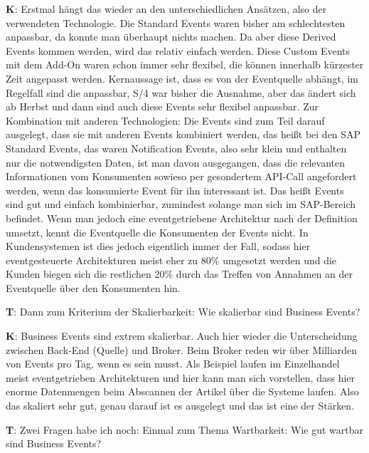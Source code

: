 \begin{list}{X:}{\setlength{\labelsep}{5mm}}
    \item[\textbf{K}:] Erstmal hängt das wieder an den unterschiedlichen Ansätzen, also der verwendeten Technologie. Die Standard Events waren bisher am schlechtesten anpassbar, da konnte man überhaupt nichts machen. Da aber diese Derived Events kommen werden, wird das relativ einfach werden. Diese Custom Events mit dem Add-On waren schon immer sehr flexibel, die können innerhalb kürzester Zeit angepasst werden. Kernaussage ist, dass es von der Eventquelle abhängt, im Regelfall sind die anpassbar, S/4 war bisher die Ausnahme, aber das ändert sich ab Herbst und dann sind auch diese Events sehr flexibel anpassbar. Zur Kombination mit anderen Technologien: Die Events sind zum Teil darauf ausgelegt, dass sie mit anderen Events kombiniert werden, das hei{\ss}t bei den SAP Standard Events, das waren Notification Events, also sehr klein und enthalten nur die notwendigsten Daten, ist man davon ausgegangen, dass die relevanten Informationen vom Konsumenten sowieso per gesondertem API-Call angefordert werden, wenn das konsumierte Event für ihn interessant ist. Das hei{\ss}t Events sind gut und einfach kombinierbar, zumindest solange man sich im SAP-Bereich befindet. Wenn man jedoch eine eventgetriebene Architektur nach der Definition umsetzt, kennt die Eventquelle die Konsumenten der Events nicht. In Kundensystemen ist dies jedoch eigentlich immer der Fall, sodass hier eventgesteuerte Architekturen meist eher zu 80\% umgesetzt werden und die Kunden biegen sich die restlichen 20\% durch das Treffen von Annahmen an der Eventquelle über den Konsumenten hin.
    \item[\textbf{T}:] Dann zum Kriterium der Skalierbarkeit: Wie skalierbar sind Business Events?
    \item[\textbf{K}:] Business Events sind extrem skalierbar. Auch hier wieder die Unterscheidung zwischen Back-End (Quelle) und Broker. Beim Broker reden wir über Milliarden von Events pro Tag, wenn es sein musst. Als Beispiel laufen im Einzelhandel meist eventgetrieben Architekturen und hier kann man sich vorstellen, dass hier enorme Datenmengen beim Abscannen der Artikel über die Systeme laufen. Also das skaliert sehr gut, genau darauf ist es ausgelegt und das ist eine der Stärken.
    \item[\textbf{T}:] Zwei Fragen habe ich noch: Einmal zum Thema Wartbarkeit: Wie gut wartbar sind Business Events?

\end{list}
